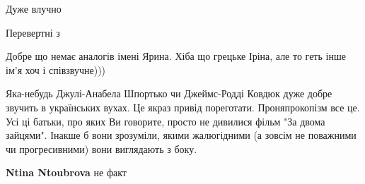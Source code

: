 \begin{itemize}
\begin{itemize}
\end{itemize}

 
Дуже влучно

 
Перевертні з

 
Добре що немає аналогів імені Ярина. Хіба що грецьке Іріна, але то геть інше ім'я хоч і співзвучне)))

 

Яка-небудь Джулі-Анабела Шпортько чи Джеймс-Родді Ковдюк дуже добре звучить в
українських вухах. \Smiley[1.0][yellow] Це якраз привід пореготати. Проняпрокопізм все це. Усі ці
батьки, про яких Ви говорите, просто не дивилися фільм "За двома зайцями".
Інакше б вони зрозуміли, якими жалюгідними (а зовсім не поважними чи
прогресивними) вони виглядають з боку. \Smiley[1.0][yellow]

\begin{itemize}
 
\textbf{Ntina Ntoubrova} не факт

 

\end{itemize}
\end{itemize}
